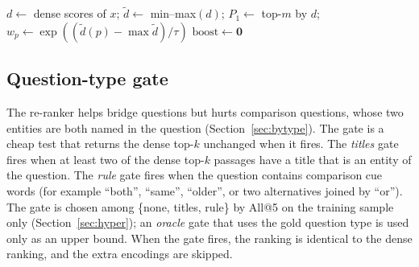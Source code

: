 \documentclass[a4paper,fleqn]{cas-sc}
\begin{document}
\begin{algorithm}[t]
\caption{Graph-restricted two-hop re-ranking}\label{alg:two}
$d\leftarrow$ dense scores of $x$; $\widetilde d\leftarrow$ min--max$(d)$; $P_1\leftarrow$ top-$m$ by $d$; $w_p\leftarrow\exp((\widetilde d(p)-\max\widetilde d)/\tau)$\;
$\mathrm{boost}\leftarrow \mathbf 0$\;
\end{algorithm}

\subsection{Question-type gate}\label{sec:gate}
The re-ranker helps bridge questions but hurts comparison questions, whose two entities are both named in the question (Section~\ref{sec:bytype}). The gate is a cheap test that returns the dense top-$k$ unchanged when it fires. The \emph{titles} gate fires when at least two of the dense top-$k$ passages have a title that is an entity of the question. The \emph{rule} gate fires when the question contains comparison cue words (for example ``both'', ``same'', ``older'', or two alternatives joined by ``or''). The gate is chosen among \{none, titles, rule\} by All@5 on the training sample only (Section~\ref{sec:hyper}); an \emph{oracle} gate that uses the gold question type is used only as an upper bound. When the gate fires, the ranking is identical to the dense ranking, and the extra encodings are skipped.
\end{document}
